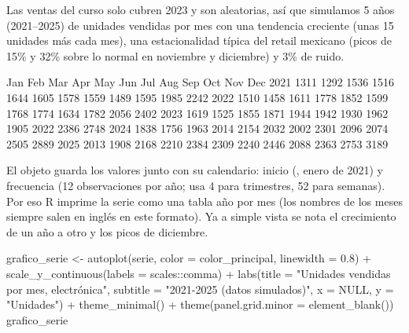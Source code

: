 Las ventas del curso solo cubren 2023 y son aleatorias, así que simulamos 5
años (2021--2025) de unidades vendidas por mes con una tendencia creciente
(unas 15 unidades más cada mes), una estacionalidad típica del retail mexicano
(picos de 15\% y 32\% sobre lo normal en noviembre y diciembre) y 3\% de ruido.


\begin{rsalida}
      Jan  Feb  Mar  Apr  May  Jun  Jul  Aug  Sep  Oct  Nov  Dec
2021 1311 1292 1536 1516 1644 1605 1578 1559 1489 1595 1985 2242
2022 1510 1458 1611 1778 1852 1599 1768 1774 1634 1782 2056 2402
2023 1619 1525 1855 1871 1944 1942 1930 1962 1905 2022 2386 2748
2024 1838 1756 1963 2014 2154 2032 2002 2301 2096 2074 2505 2889
2025 2013 1908 2168 2210 2384 2309 2240 2446 2088 2363 2753 3189
\end{rsalida}

El objeto  guarda los valores junto con su calendario: inicio
(, enero de 2021) y frecuencia (12 observaciones por
año; usa 4 para trimestres, 52 para semanas). Por eso R imprime la serie como
una tabla año por mes (los nombres de los meses siempre salen en inglés en este
formato). Ya a simple vista se nota el crecimiento de un año a
otro y los picos de diciembre.

\begin{rcode}
grafico_serie <- autoplot(serie, color = color_principal,
                          linewidth = 0.8) +
  scale_y_continuous(labels = scales::comma) +
  labs(title = "Unidades vendidas por mes, electrónica",
       subtitle = "2021-2025 (datos simulados)",
       x = NULL, y = "Unidades") +
  theme_minimal() +
  theme(panel.grid.minor = element_blank())
grafico_serie
\end{rcode}

